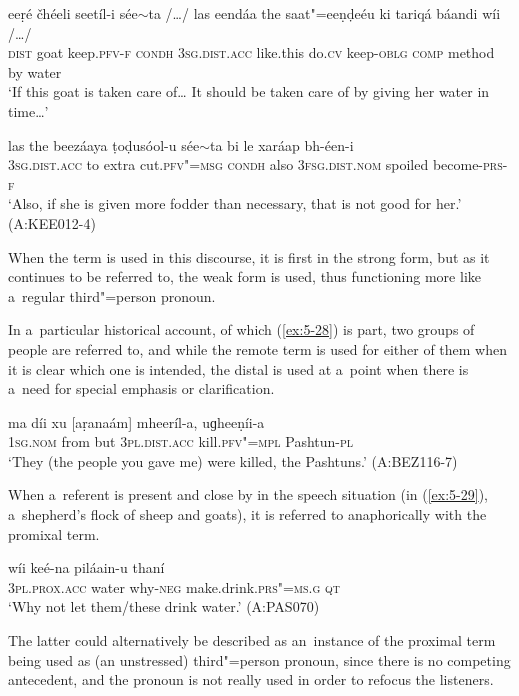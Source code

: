 \begin{exe}
\ex
\label{ex:5-27}
\gll eeṛé čhéeli seetíl-i sée$\sim$ta /{\ldots}/ las eendáa the saat"=eeṇḍeéu ki
tariqá báandi wíi /{\ldots}/ \\
\textsc{dist} goat keep.\textsc{pfv-f} \textsc{condh} {} \textsc{3sg}.\textsc{dist.acc} like.this do.\textsc{cv} keep-\textsc{oblg} \textsc{comp} method by water\\
\glt `If this goat is taken care of{\ldots} It should be taken care of by giving her water in time{\ldots}'

\gll las the beezáaya ṭoḍusóol-u sée$\sim$ta bi le xaráap bh-éen-i \\
\textsc{3sg}.\textsc{dist.acc} to extra cut.\textsc{pfv"=msg} \textsc{condh} also
\textsc{3fsg}.\textsc{dist.nom} spoiled become-\textsc{prs-f} \\
\glt `Also, if she is given more fodder than necessary, that is not good for her.' (A:KEE012-4)
\end{exe}
When the term is used in this discourse, it is first in the strong form, but as it continues to be referred to, the weak form is used, thus functioning more like a~regular third"=person pronoun.

In a~particular historical account, of which (\ref{ex:5-28}) is part, two groups of people are referred to, and while the remote term is used for either of them when it is clear which one is intended, the distal is used at a~point when there is a~need for special emphasis or clarification.

\begin{exe}
\ex
\label{ex:5-28}
\gll ma díi xu [aṛanaám] mheeríl-a, uɡheeṇíi-a\\
\textsc{1sg}.\textsc{nom} from but \textsc{3pl.}\textsc{dist.acc} kill.\textsc{pfv"=mpl} Pashtun-\textsc{pl}\\
\glt `They (the people you gave me) were killed, the Pashtuns.' (A:BEZ116-7)\\
\end{exe}
When a~referent is present and close by in the speech situation (in (\ref{ex:5-29}), a~shepherd's flock of sheep and goats), it is referred to anaphorically with the promixal term.

\begin{exe}
\ex
\label{ex:5-29}
\gll [aniaám] wíi keé-na piláain-u thaní \\
\textsc{3pl.prox.acc} water why-\textsc{neg} make.drink.\textsc{prs"=ms.g} \textsc{qt}\\
\glt `Why not let them/these drink water.' (A:PAS070)
\end{exe}
The latter could alternatively be described as an~instance of the proximal term being used as (an unstressed) third"=person pronoun, since there is no competing antecedent, and the pronoun is not really used in order to refocus the listeners.

